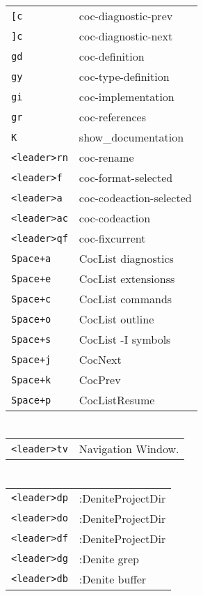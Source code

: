 \begin{multicols}{3}
\section{}
\begin{tabular}{@{}ll@{}}
	\verb![c! & coc-diagnostic-prev \\
	\verb!]c! & coc-diagnostic-next \\
	\verb!gd! & coc-definition  \\
	\verb!gy! & coc-type-definition \\
	\verb!gi! & coc-implementation \\
	\verb!gr! & coc-references  \\
	\verb!K! & show\_documentation \\
	\verb!<leader>rn! & coc-rename \\
	\verb!<leader>f ! & coc-format-selected \\
	\verb!<leader>a ! & coc-codeaction-selected \\
	\verb!<leader>ac! & coc-codeaction \\
    \verb!<leader>qf! & coc-fixcurrent \\
	\verb!Space+a! & CocList diagnostics \\
	\verb!Space+e! & CocList extensionss \\
	\verb!Space+c! & CocList commands \\
	\verb!Space+o! & CocList outline \\
	\verb!Space+s! & CocList -I symbols \\
	\verb!Space+j! & CocNext        \\
	\verb!Space+k! & CocPrev        \\
	\verb!Space+p! & CocListResume  \\
\end{tabular}

\section{}
\begin{tabular}{@{}ll@{}}
	\verb!<leader>tv! & Navigation Window. \\
\end{tabular}

\section{}
\begin{tabular}{@{}ll@{}}
	\verb!<leader>dp! & :DeniteProjectDir \\
	\verb!<leader>do! & :DeniteProjectDir \\
	\verb!<leader>df! & :DeniteProjectDir \\
	\verb!<leader>dg! & :Denite grep \\
	\verb!<leader>db! & :Denite buffer \\
\end{tabular}


\end{multicols}
